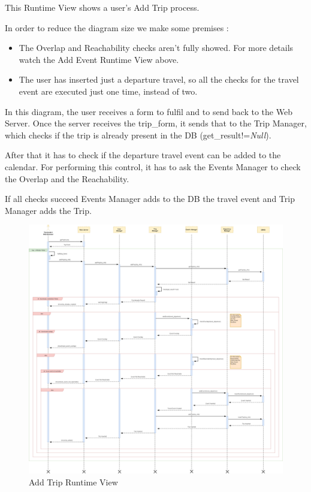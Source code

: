 This Runtime View shows a user's Add Trip process.\par
In order to reduce the diagram size we make some premises :
\begin{itemize}
	\setlength{\leftskip}{1cm}
	\item The Overlap and Reachability checks aren’t fully showed. For more details watch the Add Event Runtime View above.
	\item The user has inserted just a departure travel, so all the checks for the travel event are executed just one time, instead of two.
\end{itemize}\par
In this diagram, the user receives a form to fulfil and to send back to the Web Server.
Once the server receives the trip\_form, it sends that to the Trip Manager, which checks if the trip is already present in the DB (get\_result!=\emph{Null}).\par
After that it has to check if the departure travel event can be added to the calendar. For performing this control, it has to ask the Events Manager to check the Overlap and the Reachability.\par
If all checks succeed Events Manager adds to the DB the travel event and Trip Manager adds the Trip.
\begin{figure}[H]
	\centering
	\includegraphics[scale=0.165]{Images/Runtime/Add_Trip}
	\caption{Add Trip Runtime View}
\end{figure}

